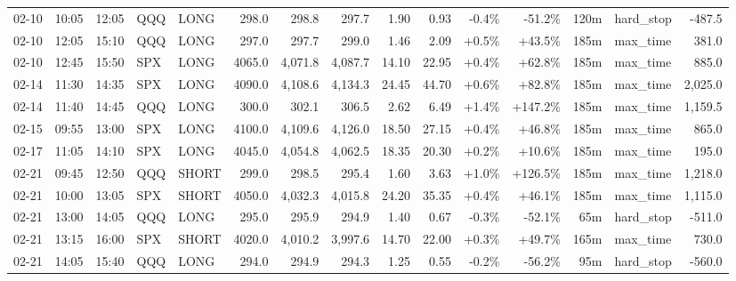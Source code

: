 \documentclass[11pt,a4paper,twoside]{article}
\begin{document}
\begin{landscape}
\begin{center}
\begin{longtable}{>{\color{txtmain}}l l l l l r r r r r r r r >{\color{txtmain}}l r}
02-10 & 10:05 & 12:05 & QQQ & LONG & 298.0 & 298.8 & 297.7 & 1.90 & 0.93 & \textcolor{lossred}{-0.4\%} & \textcolor{lossred}{-51.2\%} & 120m & hard\_stop & \textcolor{lossred}{-487.5} \\
02-10 & 12:05 & 15:10 & QQQ & LONG & 297.0 & 297.7 & 299.0 & 1.46 & 2.09 & \textcolor{wingreen}{+0.5\%} & \textcolor{wingreen}{+43.5\%} & 185m & max\_time & \textcolor{wingreen}{381.0} \\
02-10 & 12:45 & 15:50 & SPX & LONG & 4065.0 & 4,071.8 & 4,087.7 & 14.10 & 22.95 & \textcolor{wingreen}{+0.4\%} & \textcolor{wingreen}{+62.8\%} & 185m & max\_time & \textcolor{wingreen}{885.0} \\
02-14 & 11:30 & 14:35 & SPX & LONG & 4090.0 & 4,108.6 & 4,134.3 & 24.45 & 44.70 & \textcolor{wingreen}{+0.6\%} & \textcolor{wingreen}{+82.8\%} & 185m & max\_time & \textcolor{wingreen}{2,025.0} \\
02-14 & 11:40 & 14:45 & QQQ & LONG & 300.0 & 302.1 & 306.5 & 2.62 & 6.49 & \textcolor{wingreen}{+1.4\%} & \textcolor{wingreen}{+147.2\%} & 185m & max\_time & \textcolor{wingreen}{1,159.5} \\
02-15 & 09:55 & 13:00 & SPX & LONG & 4100.0 & 4,109.6 & 4,126.0 & 18.50 & 27.15 & \textcolor{wingreen}{+0.4\%} & \textcolor{wingreen}{+46.8\%} & 185m & max\_time & \textcolor{wingreen}{865.0} \\
02-17 & 11:05 & 14:10 & SPX & LONG & 4045.0 & 4,054.8 & 4,062.5 & 18.35 & 20.30 & \textcolor{wingreen}{+0.2\%} & \textcolor{wingreen}{+10.6\%} & 185m & max\_time & \textcolor{wingreen}{195.0} \\
02-21 & 09:45 & 12:50 & QQQ & SHORT & 299.0 & 298.5 & 295.4 & 1.60 & 3.63 & \textcolor{wingreen}{+1.0\%} & \textcolor{wingreen}{+126.5\%} & 185m & max\_time & \textcolor{wingreen}{1,218.0} \\
02-21 & 10:00 & 13:05 & SPX & SHORT & 4050.0 & 4,032.3 & 4,015.8 & 24.20 & 35.35 & \textcolor{wingreen}{+0.4\%} & \textcolor{wingreen}{+46.1\%} & 185m & max\_time & \textcolor{wingreen}{1,115.0} \\
02-21 & 13:00 & 14:05 & QQQ & LONG & 295.0 & 295.9 & 294.9 & 1.40 & 0.67 & \textcolor{lossred}{-0.3\%} & \textcolor{lossred}{-52.1\%} & 65m & hard\_stop & \textcolor{lossred}{-511.0} \\
02-21 & 13:15 & 16:00 & SPX & SHORT & 4020.0 & 4,010.2 & 3,997.6 & 14.70 & 22.00 & \textcolor{wingreen}{+0.3\%} & \textcolor{wingreen}{+49.7\%} & 165m & max\_time & \textcolor{wingreen}{730.0} \\
02-21 & 14:05 & 15:40 & QQQ & LONG & 294.0 & 294.9 & 294.3 & 1.25 & 0.55 & \textcolor{lossred}{-0.2\%} & \textcolor{lossred}{-56.2\%} & 95m & hard\_stop & \textcolor{lossred}{-560.0} \\

\end{longtable}
\end{center}
\end{landscape}
\end{document}
